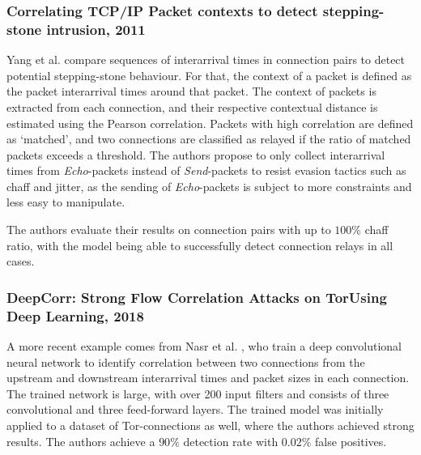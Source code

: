 \documentclass[runningheads]{llncs}\usepackage[]{graphicx}\usepackage[]{color}
\begin{document}



\subsubsection{Correlating TCP/IP Packet contexts to detect stepping-stone intrusion, 2011}

Yang et al. \cite{yang2011correlating} compare sequences of interarrival times in connection pairs to detect potential stepping-stone behaviour. For that, the context of a packet is defined as the packet interarrival times around that packet. The context of  packets is extracted from each connection, and their respective contextual distance is estimated using the Pearson correlation. Packets with high correlation are defined as `matched', and two connections are classified as relayed if the ratio of matched packets exceeds a threshold. The authors propose to only collect interarrival times from \textit{Echo}-packets instead of \textit{Send}-packets to resist evasion tactics such as chaff and jitter, as the sending of \textit{Echo}-packets is subject to more constraints and less easy to manipulate.

The authors evaluate their results on connection pairs with up to $100\%$ chaff ratio, with the model being able to successfully detect connection relays in all cases. 






\subsubsection{DeepCorr: Strong Flow Correlation Attacks on TorUsing Deep Learning, 2018}

A more recent example comes from Nasr et al. \cite{nasr2018deepcorr}, who train a deep convolutional neural network to identify correlation between two connections from the upstream and downstream interarrival times and packet sizes in each connection. The trained network is large, with over 200 input filters and consists of three convolutional and three feed-forward layers. The trained model was initially applied to a dataset of Tor-connections as well, where the authors achieved strong results. 
The authors achieve a $90\%$ detection rate with $0.02 \%$ false positives. 
\end{document}
